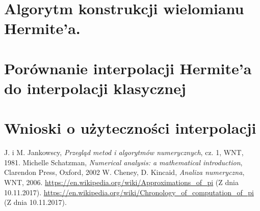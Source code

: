 \documentclass[10pt,wide]{mwart}
\theoremstyle{definition}
\begin{document}
 \section{Algorytm konstrukcji wielomianu Hermite'a.}

\section{Porównanie interpolacji Hermite'a do interpolacji klasycznej}

\section{Wnioski o użyteczności interpolacji }


\begin{thebibliography}{9}
\itemsep10pt
 J. i M. Jankowscy, \emph{Przegląd metod i algorytmów numerycznych}, cz. 1, WNT, 1981.
 Michelle Schatzman, \emph{Numerical analysis: a mathematical introduction}, Clarendon Press, Oxford, 2002
 W. Cheney, D. Kincaid, \emph{Analiza numeryczna}, WNT, 2006.
 \url{https://en.wikipedia.org/wiki/Approximations_of_pi} (Z dnia 10.11.2017).
 \url{https://en.wikipedia.org/wiki/Chronology_of_computation_of_pi} (Z dnia 10.11.2017).
\end{thebibliography}
\end{document}
